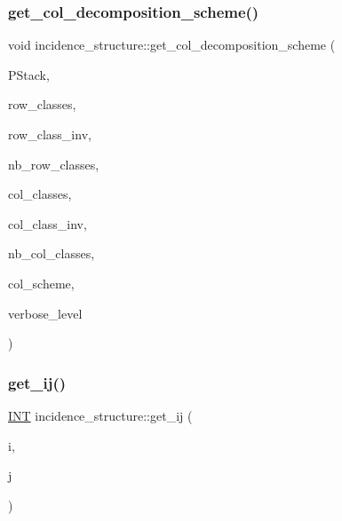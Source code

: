 \subsubsection{\texorpdfstring{get\+\_\+col\+\_\+decomposition\+\_\+scheme()}{get\_col\_decomposition\_scheme()}}
{\footnotesize\ttfamily void incidence\+\_\+structure\+::get\+\_\+col\+\_\+decomposition\+\_\+scheme (\begin{DoxyParamCaption}\item[{\mbox{\hyperlink{classpartitionstack}{partitionstack}} \&}]{P\+Stack,  }\item[{\mbox{\hyperlink{galois_8h_a09fddde158a3a20bd2dcadb609de11dc}{I\+NT}} $\ast$}]{row\+\_\+classes,  }\item[{\mbox{\hyperlink{galois_8h_a09fddde158a3a20bd2dcadb609de11dc}{I\+NT}} $\ast$}]{row\+\_\+class\+\_\+inv,  }\item[{\mbox{\hyperlink{galois_8h_a09fddde158a3a20bd2dcadb609de11dc}{I\+NT}}}]{nb\+\_\+row\+\_\+classes,  }\item[{\mbox{\hyperlink{galois_8h_a09fddde158a3a20bd2dcadb609de11dc}{I\+NT}} $\ast$}]{col\+\_\+classes,  }\item[{\mbox{\hyperlink{galois_8h_a09fddde158a3a20bd2dcadb609de11dc}{I\+NT}} $\ast$}]{col\+\_\+class\+\_\+inv,  }\item[{\mbox{\hyperlink{galois_8h_a09fddde158a3a20bd2dcadb609de11dc}{I\+NT}}}]{nb\+\_\+col\+\_\+classes,  }\item[{\mbox{\hyperlink{galois_8h_a09fddde158a3a20bd2dcadb609de11dc}{I\+NT}} $\ast$}]{col\+\_\+scheme,  }\item[{\mbox{\hyperlink{galois_8h_a09fddde158a3a20bd2dcadb609de11dc}{I\+NT}}}]{verbose\+\_\+level }\end{DoxyParamCaption})}

\mbox{\label{classincidence__structure_a5ee9b327bdd0c2714cadff040a4c4678}} 
\subsubsection{\texorpdfstring{get\+\_\+ij()}{get\_ij()}}
{\footnotesize\ttfamily \mbox{\hyperlink{galois_8h_a09fddde158a3a20bd2dcadb609de11dc}{I\+NT}} incidence\+\_\+structure\+::get\+\_\+ij (\begin{DoxyParamCaption}\item[{\mbox{\hyperlink{galois_8h_a09fddde158a3a20bd2dcadb609de11dc}{I\+NT}}}]{i,  }\item[{\mbox{\hyperlink{galois_8h_a09fddde158a3a20bd2dcadb609de11dc}{I\+NT}}}]{j }\end{DoxyParamCaption})}

